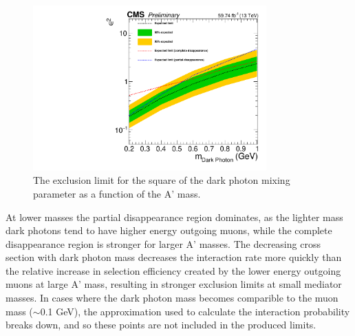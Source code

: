 \begin{figure}[htbp]
	\centering
	\includegraphics[width=0.8\textwidth]{figures/Limit_AllRegions.pdf}
	\caption[Exclusion Limits on the Dark Photon Mixing Parameter]{The exclusion limit for the square of the dark photon mixing parameter as a function of the A' mass.}
	\label{fig:limits}
\end{figure}

At lower masses the partial disappearance region dominates, as the lighter mass dark photons tend to have higher energy outgoing muons, while the complete disappearance region is stronger for larger A' masses. 
The decreasing cross section with dark photon mass decreases the interaction rate more quickly than the relative increase in selection efficiency created by the lower energy outgoing muons at large A' mass, resulting in stronger exclusion limits at small mediator masses. 
In cases where the dark photon mass becomes comparible to the muon mass ($\sim$0.1 GeV), the \ww approximation used to calculate the interaction probability breaks down, and so these points are not included in the produced limits.

